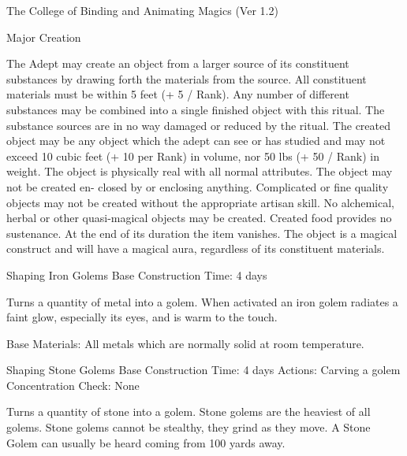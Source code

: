 \begin{Chapter}{The College of Binding and Animating Magics (Ver 1.2)}
\begin{ritual}[R-4]{Major Creation }
\begin{effects}
The Adept may create an object from a larger source of its constituent
substances by drawing forth the materials from the source.  All
constituent materials must be within 5 feet (+ 5 / Rank). Any number
of different substances may be combined into a single finished object
with this ritual.  The substance sources are in no way damaged or
reduced by the ritual.  The created object may be any object which the
adept can see or has studied and may not exceed 10 cubic feet (+ 10
per Rank) in volume, nor 50 lbs (+ 50 / Rank) in weight.  The object
is physically real with all normal attributes.  The object may not be
created en- closed by or enclosing anything.  Complicated or fine
quality objects may not be created without the appropriate artisan
skill.  No alchemical, herbal or other quasi-magical objects may be
created.  Created food provides no sustenance. At the end of its
duration the item vanishes. The object is a magical construct and will
have a magical aura, regardless of its constituent materials.
\end{effects}
\end{ritual}

\begin{ritual}[R-5]{Shaping Iron Golems }
Base Construction Time: 4 days 
\begin{effects}
Turns a quantity of metal into a golem.  When activated an iron golem
radiates a faint glow, especially its eyes, and is warm to the touch.

Base Materials: All metals which are normally solid at room
temperature.
\end{effects}
\end{ritual}

\begin{ritual}[R-6]{Shaping Stone Golems }
Base Construction Time: 4 days 
Actions: Carving a golem 
Concentration Check: None 
\begin{effects}
Turns a quantity of stone into a golem.  Stone golems are the heaviest
of all golems. Stone golems cannot be stealthy, they grind as they
move. A Stone Golem can usually be heard coming from 100 yards away.


\end{effects}
\end{ritual}
\end{Chapter}
